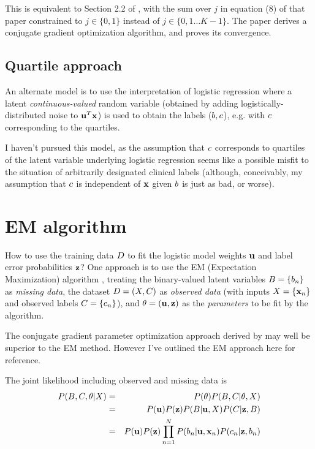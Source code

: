 \documentclass{article}
\begin{document}
This is equivalent to Section 2.2 of \cite{BootkrajangKaban2012},
with the sum over $j$ in equation (8) of that paper constrained to $j\in\{0,1\}$
instead of $j\in\{0,1\ldots K-1\}$.
The paper derives a conjugate gradient optimization algorithm,
and proves its convergence.

\subsection{Quartile approach}

An alternate model is to use the interpretation of logistic regression where a latent {\em continuous-valued} random variable
(obtained by adding logistically-distributed noise to ${\bf u}^T {\bf x}$)
is used to obtain the labels ($b,c$),
e.g. with $c$ corresponding to the quartiles.

I haven't pursued this model, as the assumption that $c$ corresponds to quartiles of the latent variable underlying
logistic regression seems like a possible misfit to the situation of arbitrarily designated clinical labels
(although, conceivably, my assumption that $c$ is independent of ${\bf x}$ given $b$ is just as bad, or worse).


\section{EM algorithm}

How to use the training data $D$ to fit the logistic model weights ${\bf u}$ and label error probabilities ${\bf z}$?
One approach is to use the EM (Expectation Maximization) algorithm \cite{DempsterLairdRubin77},
treating the binary-valued latent variables $B = \{ b_n \}$ as {\em missing data},
the dataset $D = (X,C)$ as {\em observed data}
(with inputs $X = \{ {\bf x}_n \}$ and observed labels $C = \{ c_n \}$),
and $\theta = ({\bf u},{\bf z})$ as the {\em parameters} to be fit by the algorithm.

The conjugate gradient parameter optimization approach
derived by \cite{BootkrajangKaban2012} may well be superior to the EM method.
However I've outlined the EM approach here for reference.

The joint likelihood including observed and missing data is
\begin{eqnarray*}
  P(B,C,\theta|X)
  & = & P(\theta) P(B,C|\theta,X) \\
  & = & P({\bf u}) P({\bf z}) P(B|{\bf u},X) P(C|{\bf z},B) \\
  & = & P({\bf u}) P({\bf z}) \prod_{n=1}^{N} P(b_{n}|{\bf u},{\bf x}_{n}) P(c_{n}|{\bf z},b_{n})
\end{eqnarray*}
\end{document}
